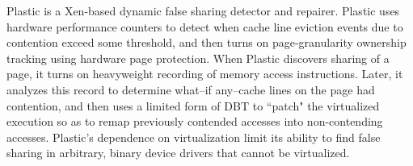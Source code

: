 \documentclass[letterpaper,twocolumn,10pt]{article}
\newcommand{\TextToolname}{Malcontent}
\newcommand{\Toolname}{\textsc{\TextToolname{}}}
\begin{document}
%
%






Plastic \cite{Plastic} is a Xen-based dynamic false sharing detector and repairer. Plastic uses hardware performance counters
to detect when cache line eviction events due to contention exceed some threshold, and then turns on page-granularity
ownership tracking using hardware page protection. When Plastic discovers sharing of a page, it turns on heavyweight recording
of memory access instructions. Later, it analyzes this record to determine what--if any--cache lines on the page had contention,
and then uses a limited form of DBT to ``patch" the virtualized execution so as to remap previously contended accesses into
non-contending accesses. Plastic's dependence on virtualization limit its ability to find false sharing in arbitrary, binary device
drivers that cannot be virtualized.
\end{document}
